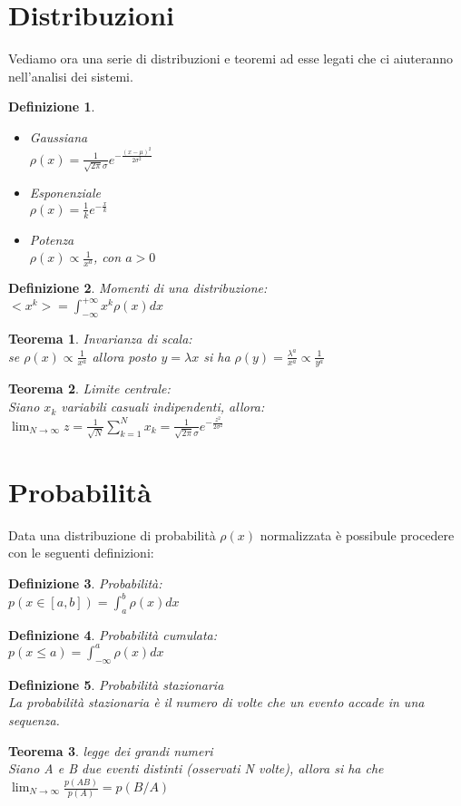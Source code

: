 \documentclass[12pt, a4paper]{book}
\theoremstyle{theorem}
\newtheorem{definition}{Definizione}[section]
\newtheorem{theorem}{Teorema}[section]
\begin{document}
		\section{Distribuzioni}
		Vediamo ora una serie di distribuzioni e teoremi ad esse legati che ci aiuteranno nell'analisi dei sistemi.
		\begin{definition}\hfill
			\begin{itemize}
				\item Gaussiana\\	$\rho(x)=\frac{1}{\sqrt{2\pi}\sigma}e^{-\frac{(x-\mu)^2}{2\sigma^2}}$
				\item Esponenziale\\	$\rho(x)=\frac{1}{k}e^{-\frac{x}{k}}$
				\item Potenza\\		$\rho(x)\propto\frac{1}{x^a}$, con $a>0$
			\end{itemize}
		\end{definition}
		\begin{definition}
			Momenti di una distribuzione:\\
			$<x^k>=\int_{-\infty}^{+\infty}x^k\rho(x)dx$
		\end{definition}
		\begin{theorem}
			Invarianza di scala:\\
			se $\rho(x)\propto\frac{1}{x^a}$ allora posto $y=\lambda x$ si ha $\rho(y)=\frac{\lambda^a}{x^a}\propto\frac{1}{y^a}$
		\end{theorem}
		\begin{theorem}
			Limite centrale:\\
			Siano ${x_k}$ variabili casuali indipendenti, allora:\\
			$\lim_{N\to\infty}z=\frac{1}{\sqrt{N}}\sum_{k=1}^{N}x_k=\frac{1}{\sqrt{2\pi}\sigma}e^{-\frac{z^2}{2\sigma^2}}$
		\end{theorem}
		
		\section{Probabilità}
			Data una distribuzione di probabilità $\rho(x)$ normalizzata è possibule procedere con le seguenti definizioni:
			\begin{definition} Probabilità:\\
				$p(x\in[a,b])=\int_{a}^{b}\rho(x)dx$
			\end{definition}
			\begin{definition} Probabilità cumulata:\\
				$p(x\leq a)=\int_{-\infty}^{a}\rho(x)dx$
			\end{definition}
			\begin{definition}
				Probabilità stazionaria\\
				La probabilità stazionaria è il numero di volte che un evento accade in una sequenza.
			\end{definition}
			\begin{theorem}
				legge dei grandi numeri\\
				Siano A e B due eventi distinti (osservati N volte), allora si ha che\\
				$\lim_{N\to\infty}\frac{p(AB)}{p(A)}=p(B/A)$
			\end{theorem}
\end{document}
